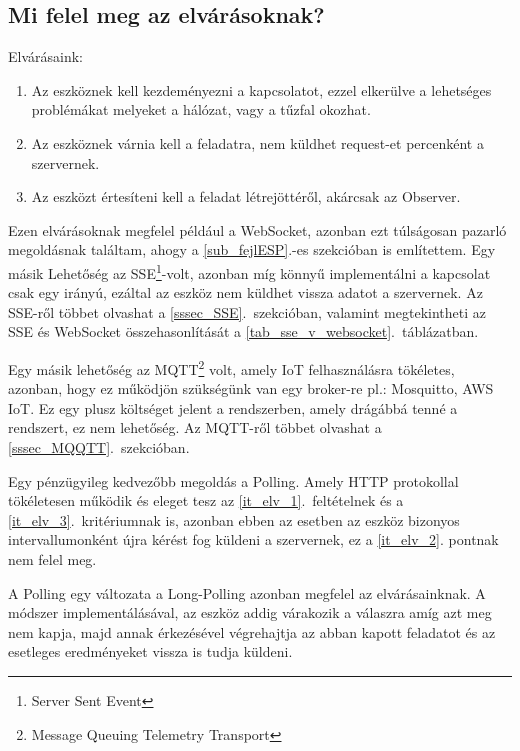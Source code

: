 \documentclass{thesis-ekf}
\theoremstyle{definition}
\theoremstyle{remark}
\begin{document}
	\subsection{Mi felel meg az elvárásoknak?}
	Elvárásaink:
	\begin{enumerate}
		\item Az eszköznek kell kezdeményezni a kapcsolatot, ezzel elkerülve a lehetséges problémákat melyeket a hálózat, vagy a tűzfal okozhat. \label{it_elv_1}
		\item Az eszköznek várnia kell a feladatra, nem küldhet request-et percenként a szervernek. \label{it_elv_2}
		\item Az eszközt értesíteni kell a feladat létrejöttéről, akárcsak az Observer.\label{it_elv_3}
	\end{enumerate}
	Ezen elvárásoknak megfelel például a WebSocket, azonban ezt túlságosan pazarló megoldásnak találtam, ahogy a \ref{sub_fejlESP}.-es szekcióban is említettem. Egy másik Lehetőség az SSE\footnote{Server Sent Event}-volt, azonban míg könnyű implementálni a kapcsolat csak egy irányú, ezáltal az eszköz nem küldhet vissza adatot a szervernek\cite{bib_SSE}. Az SSE-ről többet olvashat a \ref{sssec_SSE}.~szekcióban, valamint megtekintheti az SSE és WebSocket összehasonlítását a \ref{tab_sse_v_websocket}.~táblázatban.
	
	Egy másik lehetőség az MQTT\footnote{Message Queuing Telemetry Transport} volt, amely IoT felhasználásra tökéletes, azonban, hogy ez működjön szükségünk van egy broker-re pl.: Mosquitto, AWS IoT. Ez egy plusz költséget jelent a rendszerben, amely drágábbá tenné a rendszert, ez nem lehetőség\cite{bib_MQTT}. Az MQTT-ről többet olvashat a \ref{sssec_MQQTT}.~szekcióban.
	
	Egy pénzügyileg kedvezőbb megoldás a Polling. Amely HTTP protokollal tökéletesen működik és eleget tesz az \ref{it_elv_1}.~feltételnek és a \ref{it_elv_3}.~kritériumnak is, azonban ebben az esetben az eszköz bizonyos intervallumonként újra kérést fog küldeni a szervernek, ez a \ref{it_elv_2}. pontnak nem felel meg.
	
	A Polling egy változata a Long-Polling azonban megfelel az elvárásainknak. A módszer implementálásával, az eszköz addig várakozik a válaszra amíg azt meg nem kapja, majd annak érkezésével végrehajtja az abban kapott feladatot és az esetleges eredményeket vissza is tudja küldeni. 
\end{document}
